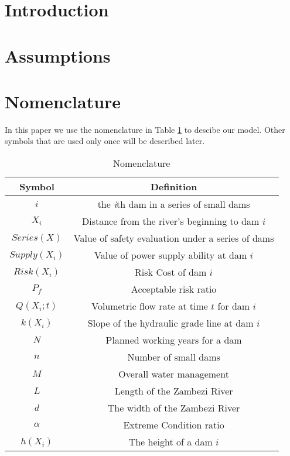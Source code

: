 \documentclass{mcmthesis}
\begin{document}
\maketitle

\tableofcontents

\newpage

\section{Introduction}	

%
\section{Assumptions}\label{Sec-Assume}
%
\section{Nomenclature}\label{Sec-Nomen}
In this paper we use the nomenclature in Table \ref{tab:Nomen} to descibe our model. Other symbols that are used only once will be described later.
\begin{table}
    \centering
    \caption{Nomenclature}
    \label{tab:Nomen}
    \begin{tabular}{c c}
\hline
    	Symbol & Definition\\
\hline
	$i$ & the \emph{i}th dam in a series of small dams\\
	$X_i$ & Distance from the river's beginning to dam $i$\\
	$Series(X)$ & Value of safety evaluation under a series of dams\\
	$Supply(X_i)$ & Value of power supply ability at dam $i$\\
	$Risk(X_i)$ & Risk Cost of dam $i$\\
	$P_f$ & Acceptable risk ratio\\
	$Q(X_i;t)$ & Volumetric flow rate at time $t$ for dam $i$\\
	$k(X_i)$ & Slope of the hydraulic grade line at dam $i$\\
	$N$ & Planned working years for a dam\\
	$n$ & Number of small dams\\
	$M$ & Overall water management\\
	$L$ & Length of the Zambezi River\\
	$d$ & The width of the Zambezi River\\
	$\alpha$& Extreme Condition ratio\\
	$h(X_i)$ & The height of a dam $i$\\
\hline
    \end{tabular}
\end{table}
\end{document}
